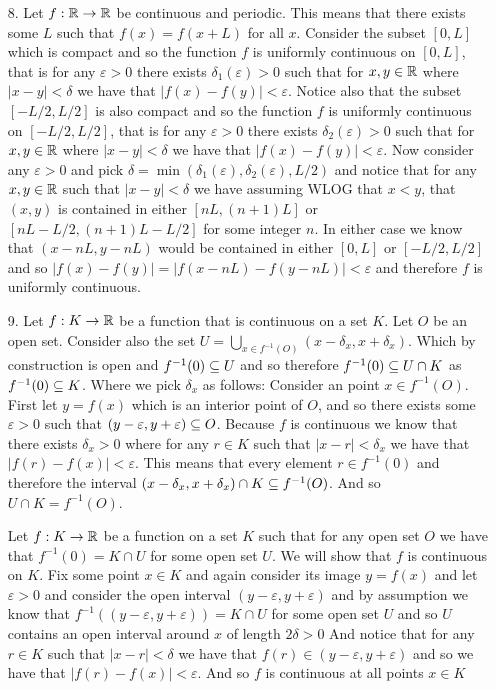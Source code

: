 \documentclass[12pt]{amsart}
\begin{document}
\begin{itemize}
    \item[8.] Let $f:\mathbb{R}\rightarrow \mathbb{R}$ be continuous and periodic. This means that there exists some $L$ such that $f(x)=f(x+L)$ for all $x$.
        Consider the subset $[0,L]$ which is compact and so the function $f$ is uniformly continuous on $[0,L]$, that is for any
        $\varepsilon>0$ there exists $\delta_1(\varepsilon)>0$ such that for $x,y\in\mathbb{R}$ where $|x-y|<\delta$ we have that $|f(x)-f(y)|<\varepsilon$.
        Notice also that the subset $[-L/2,L/2]$ is also compact and so the function $f$ is uniformly continuous on $[-L/2,L/2]$, that is for any
        $\varepsilon>0$ there exists $\delta_2(\varepsilon)>0$ such that for $x,y\in\mathbb{R}$ where $|x-y|<\delta$ we have that $|f(x)-f(y)|<\varepsilon$.
        Now consider any $\varepsilon >0$ and pick $\delta=\min(\delta_1(\varepsilon),\delta_2(\varepsilon), L/2)$ and notice that for any $x,y\in\mathbb{R}$ such that $|x-y|<\delta$
        we have assuming WLOG that $x<y$, that $(x,y)$ is contained in either $[nL,(n+1)L]$ or $[nL-L/2,(n+1)L-L/2]$ for some integer $n$.
        In either case we know that $(x-nL,y-nL)$ would be contained in either $[0,L]$ or $[-L/2,L/2]$ and so $|f(x)-f(y)|=|f(x-nL)-f(y-nL)|<\varepsilon$ and therefore
        $f$ is uniformly continuous.

    \item[9.] %
        Let $f:K\rightarrow\mathbb{R}$ be a function that is continuous on a set $K$. Let $O$ be an open set.
        Consider also the set $U=\bigcup_{x\in f^{-1}(O)}(x-\delta_x,x+\delta_x)$. Which by construction is open and $f^{-1}(0)\subseteq U$ and so therefore
        $f^{-1}(0)\subseteq U\cap K$ as $f^{-1}(0)\subseteq K$.
        Where we pick $\delta_x$ as follows:
        Consider an point $x\in f^{-1}(O)$. First let $y=f(x)$
        which is an interior point of $O$, and so there exists some $\varepsilon>0$
        such that $(y-\varepsilon, y+\varepsilon)\subseteq O$. Because $f$ is continuous we know that there exists $\delta_x>0$
        where for any $r\in K$ such that $|x-r|<\delta_x$ we have that $|f(r)-f(x)|<\varepsilon$. This means that every element $r\in f^{-1}(0)$
        and therefore the interval $(x-\delta_x,x+\delta_x)\cap K\subseteq f^{-1}(O)$. And so $U\cap K= f^{-1}(O)$.

        Let $f:K\rightarrow\mathbb{R}$ be a function on a set $K$ such that for any open set $O$ we
        have that $f^{-1}(0)=K\cap U$ for some open set $U$. We will show that $f$ is
        continuous on $K$. Fix some point $x\in K$ and again consider its image
        $y=f(x)$ and let $\varepsilon>0$ and consider the open interval
        $(y-\varepsilon, y+\varepsilon)$ and by assumption we know that
        $f^{-1}((y-\varepsilon, y+\varepsilon))=K\cap U$ for some open set $U$ and so
        $U$ contains an open interval around $x$ of length $2\delta>0$ And notice that
        for any $r\in K$ such that $|x-r|<\delta$ we have that $f(r)\in(y-\varepsilon,
            y+\varepsilon)$ and so we have that $|f(r)-f(x)|<\varepsilon$. And so $f$ is
        continuous at all points $x\in K$

\end{itemize}
\end{document}
